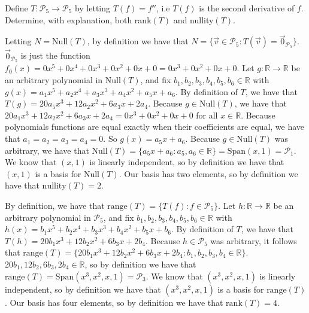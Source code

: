 \documentclass[12pt]{article}
\newenvironment{problem}[2][Problem]
{
	\begin{trivlist} 
		\item[\hskip \labelsep {\bfseries #1 #2:}]
	}
{
	\end{trivlist}
	}
\newenvironment{solution}[1][Solution]
{
	\begin{trivlist} 
		\item[\hskip \labelsep {\itshape #1:}]
	}
	{
	\end{trivlist}
}
\begin{document}
\newpage
\begin{problem}{5}
Define $T:\mathcal{P}_5 \to \mathcal{P}_5$ by letting $T(f)=f''$, i.e $T(f)$ is the second derivative of $f$. Determine, with explanation, both rank$(T)$ and nullity$(T)$.
\noindent
\newline
\newline
\begin{solution}
Letting $N=\text{Null}(T)$, by definition we have that $N=\{\vec{v} \in \mathcal{P}_5: T(\vec{v})=\vec{0}_{\mathcal{P}_5}\}$. $\vec{0}_{\mathcal{P}_5}$ is just the function $f_0(x)=0x^5 + 0x^4+0x^3 +0x^2 + 0x +0 = 0x^3 +0x^2 + 0x +0 $. Let $g:\mathbb{R} \to \mathbb{R}$ be an arbitrary polynomial in $\text{Null}(T)$, and fix $b_1,b_2,b_3,b_4,b_5,b_6 \in \mathbb{R}$ with $g(x)=a_1 x^5 + a_2 x^4 + a_3 x^3 + a_4 x^2 +a_5 x + a_6$. By definition of $T$, we have that $T(g)=20 a_5 x^3 + 12 a_2 x^2 +6 a_3 x + 2 a_4$. Because $g \in \text{Null}(T)$, we have that $20 a_1 x^3 + 12 a_2 x^2 +6 a_3 x + 2 a_4=0x^3 +0x^2 + 0x +0$ for all $x \in \mathbb{R}$. Because polynomials functions are equal exactly when their coefficients are equal, we have that $a_1=a_2=a_3=a_4=0$. So $g(x) = a_5x +a_6$. Because $g \in \text{Null}(T)$ was arbitrary, we have that $\text{Null}(T)=\{a_5x + a_6:a_5,a_6 \in \mathbb{R}\} = \text{Span}(x,1) = \mathcal{P}_1$. We know that $(x,1)$ is linearly independent, so by definition we have that $(x,1)$ is a basis for $\text{Null}(T)$. Our basis has two elements, so by definition we have that $\text{nullity}(T)=2$.

By definition, we have that $\text{range}(T)=\{T(f):f\in \mathcal{P}_5\}$. Let $h:\mathbb{R}\to \mathbb{R}$ be an arbitrary polynomial in $\mathcal{P}_5$, and fix $b_1,b_2,b_3,b_4,b_5,b_6 \in \mathbb{R}$ with $h(x)=b_1 x^5 + b_2 x^4 + b_3 x^3 + b_4 x^2 +b_5 x + b_6$. By definition of $T$, we have that $T(h)=20 b_1 x^3 + 12 b_2 x^2 +6 b_3 x + 2 b_4$. Because $h \in \mathcal{P}_5$ was arbitrary, it follows that $\text{range}(T)=\{20 b_1 x^3 + 12 b_2 x^2 +6 b_3 x + 2 b_4 : b_1,b_2,b_3,b_4 \in \mathbb{R}\}$. $20b_1,12b_2,6b_3,2b_4 \in \mathbb{R}$, so by definition we have that $\text{range}(T)= \text{Span}(x^3,x^2,x,1) = \mathcal{P}_3$. We know that $(x^3,x^2,x,1)$ is linearly independent, so by definition we have that $(x^3,x^2,x,1)$ is a basis for $\text{range}(T)$. Our basis has four elements, so by definition we have that $\text{rank}(T)=4$.
\end{solution}
\end{problem}
\end{document}
